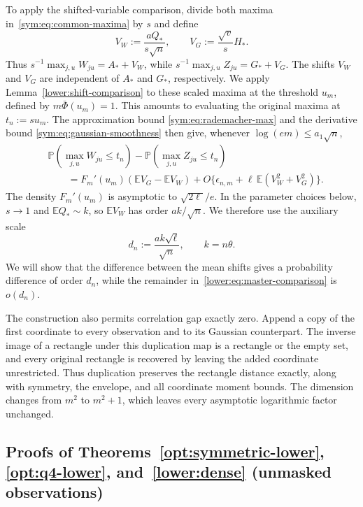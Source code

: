 \documentclass[11pt,letterpaper]{article}
\newenvironment{recovered}{\color{magenta}}{}
\theoremstyle{remark}
\newcommand{\E}{\mathbb E}
\newcommand{\Pp}{\mathbb P}
\begin{document}
To apply the shifted-variable comparison, divide both maxima
in~\eqref{sym:eq:common-maxima} by \(s\) and define
\[
 V_W:=\frac{aQ_*}{s\sqrt n},\qquad
 V_G:=\frac{\sqrt v}{s}H_*.
\]
Thus \(s^{-1}\max_{j,u}W_{ju}=A_*+V_W\), while
\(s^{-1}\max_{j,u}Z_{ju}=G_*+V_G\).
\begin{recovered}
The shifts \(V_W\) and \(V_G\) are independent of \(A_*\) and
\(G_*\), respectively. We apply Lemma~\ref{lower:shift-comparison}
to these scaled maxima at the threshold \(u_m\), defined by
\(m\bar\Phi(u_m)=1\). This amounts to evaluating the original maxima
at \(t_n:=su_m\). The approximation bound
\eqref{sym:eq:rademacher-max} and the derivative bound
\eqref{sym:eq:gaussian-smoothness} then give, whenever
\(\log(em)\le a_1\sqrt n\),
\end{recovered}
\begin{equation}
\begin{split}
 &\Pp(\max_{j,u}W_{ju}\le t_n)-\Pp(\max_{j,u}Z_{ju}\le t_n)\\
 &\qquad=F_m'(u_m)(\E V_G-\E V_W)
       +O\{\epsilon_{n,m}+\ell\,\E(V_W^2+V_G^2)\}.
\end{split}
 \label{lower:eq:master-comparison}
\end{equation}
The density \(F_m'(u_m)\) is asymptotic to \(\sqrt{2\ell}/e\).
In the parameter choices below, \(s\to1\) and \(\E Q_*\sim k\),
so \(\E V_W\) has order \(ak/\sqrt n\).
We therefore use the auxiliary scale
\begin{equation}
 d_n:=\frac{ak\sqrt\ell}{\sqrt n},\qquad k=n\theta.
 \label{lower:eq:proof-scale}
\end{equation}
We will show that the difference between the mean shifts gives a
probability difference of order \(d_n\), while the remainder
in~\eqref{lower:eq:master-comparison} is \(o(d_n)\).


The construction also permits correlation gap
exactly zero. Append a copy of the first coordinate to every
observation and to its Gaussian counterpart. The inverse image of
a rectangle under this duplication map is a rectangle or the empty
set, and every original rectangle is recovered by leaving the added
coordinate unrestricted. Thus duplication preserves the rectangle
distance exactly, along with symmetry, the envelope, and all
coordinate moment bounds. The dimension changes from \(m^2\) to
\(m^2+1\), which leaves every asymptotic logarithmic factor unchanged.

\subsection{Proofs of Theorems~\ref*{opt:symmetric-lower}, \ref*{opt:q4-lower}, and~\ref*{lower:dense} (unmasked observations)}
\label{app:symmetric-lower}
\end{document}
